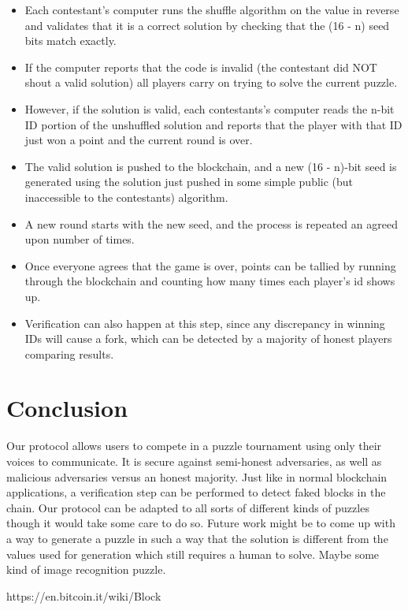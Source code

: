 \documentclass[leqno,12pt]{article}
\begin{document}
\begin{itemize}
\item Each contestant’s computer runs the shuffle algorithm on the value in reverse and validates that it is a correct solution by checking that the (16 - n) seed bits match exactly.
\item If the computer reports that the code is invalid (the contestant did NOT shout a valid solution) all players carry on trying to solve the current puzzle.
\item However, if the solution is valid, each contestants’s computer reads the n-bit ID portion of the unshuffled solution and reports that the player with that ID just won a point and the current round is over.
\item The valid solution is pushed to the blockchain, and a new (16 - n)-bit seed is generated using the solution just pushed in some simple public (but inaccessible to the contestants) algorithm.
\item A new round starts with the new seed, and the process is repeated an agreed upon number of times.
\item Once everyone agrees that the game is over, points can be tallied by running through the blockchain and counting how many times each player’s id shows up.
\item Verification can also happen at this step, since any discrepancy in winning IDs will cause a fork, which can be detected by a majority of honest players comparing results.
\end{itemize}

\section{Conclusion}
Our protocol allows users to compete in a puzzle tournament using only their voices to communicate. It is secure against semi-honest adversaries, as well as malicious adversaries versus an honest majority. Just like in normal blockchain applications, a verification step can be performed to detect faked blocks in the chain. Our protocol can be adapted to all sorts of different kinds of puzzles though it would take some care to do so. Future work might be to come up with a way to generate a puzzle in such a way that the solution is different from the values used for generation which still requires a human to solve. Maybe some kind of image recognition puzzle.

\begin{thebibliography}{9}
   https://en.bitcoin.it/wiki/Block
\end{thebibliography}
\end{document}
